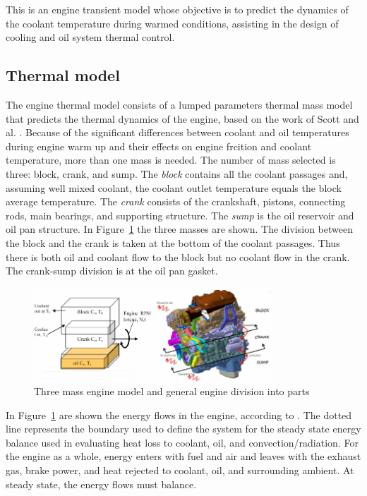 This is an engine transient model whose objective is to predict the dynamics of the coolant temperature during warmed conditions, assisting in the design of cooling and oil system thermal control. 

\subsection{Thermal model}

The engine thermal model consists of a lumped parameters thermal mass model that predicts the thermal dynamics of the engine, based on the work of Scott and al. \cite{Scott2012}. Because of the significant differences between coolant and oil temperatures during engine warm up and their effects on engine frcition and coolant temperature, more than one mass is needed. The number of mass selected is three: block, crank, and sump. The \emph{block} contains all the coolant passages and, assuming well mixed coolant, the coolant outlet temperature equals the block average temperature. The \emph{crank} consists of the crankshaft, pistons, connecting rods, main bearings, and supporting structure. The \emph{sump} is the oil reservoir and oil pan structure. In Figure~\ref{fig:engine_mass_scheme} the three masses are shown. The division between the block and the crank is taken at the bottom of the coolant passages. Thus there is both oil and coolant flow to the block but no coolant flow in the crank. The crank-sump division is at the oil pan gasket.

\begin{figure}[ht]
  \centering
  \includegraphics[width=0.8\textwidth]{figures/model/engine_mass_scheme.pdf}
  \caption{Three mass engine model and general engine division into parts\label{fig:engine_mass_scheme} }
\end{figure}

In Figure~\ref{fig:engine_mass_scheme} are shown the energy flows in the engine, according to \cite{Scott2012}. The dotted line represents the boundary used to define the system for the steady state energy balance used in evaluating heat loss to coolant, oil, and convection/radiation. For the engine as a whole, energy enters with fuel and air and leaves with the exhaust gas, brake power, and heat rejected to coolant, oil, and surrounding ambient. At steady state, the energy flows must balance.

